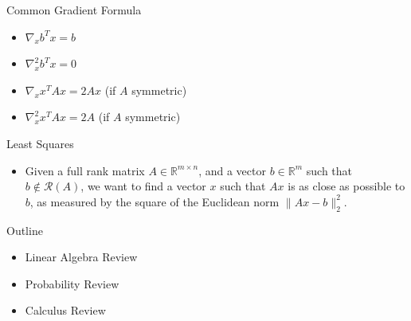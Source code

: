 \documentclass[aspectratio=169,12pt]{beamer}
\begin{document}
\begin{frame}[t]{Common Gradient Formula}
  \vspace{0.45cm}
  {\fontsize{18}{23}\selectfont
  \begin{itemize}
    \setlength{\itemsep}{0.52cm}
    \item $\nabla_x b^Tx=b$
    \item $\nabla_x^2 b^Tx=0$
    \item $\nabla_x x^TAx=2Ax$ (if $A$ symmetric)
    \item $\nabla_x^2 x^TAx=2A$ (if $A$ symmetric)
  \end{itemize}
  }
\end{frame}

\begin{frame}[t]{Least Squares}
  \vspace{0.62cm}
  {\large
  \begin{itemize}
    \item Given a full rank matrix $A\in\mathbb{R}^{m\times n}$, and a vector
          $b\in\mathbb{R}^{m}$ such that $b\notin\mathcal{R}(A)$, we want to find
          a vector $x$ such that $Ax$ is as close as possible to $b$, as measured
          by the square of the Euclidean norm $\|Ax-b\|_2^2$.
  \end{itemize}
  }
\end{frame}

\begin{frame}[t]{Outline}
  \vspace{1.10cm}
  {\fontsize{21}{26}\selectfont
  \begin{itemize}
    \setlength{\itemsep}{0.75cm}
    \item \textcolor{fadedgray}{Linear Algebra Review}
    \item Probability Review
    \item  \textcolor{fadedgray}{Calculus Review}
  \end{itemize}}
\end{frame}
\end{document}
